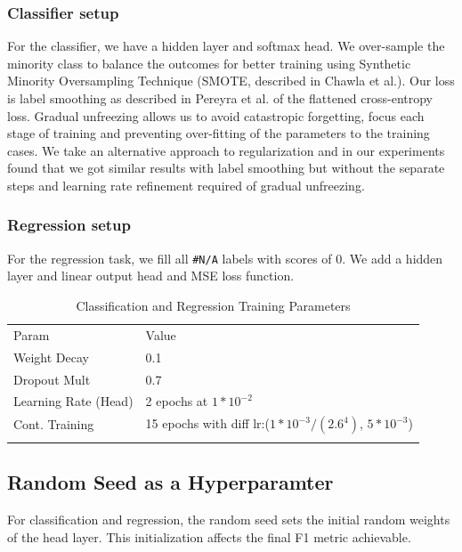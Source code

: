 \documentclass[runningheads]{llncs}
\begin{document}
\subsubsection{Classifier setup}  For the classifier, we have a hidden layer and softmax head.  We over-sample the minority class to balance the outcomes for better training using Synthetic Minority Oversampling Technique (SMOTE, described in Chawla et al.\cite{Chawla:2002:SSM:1622407.1622416}).  Our loss is label smoothing as described in Pereyra et al.\cite{Labelsmoothing:DBLP:journals/corr/PereyraTCKH17} of the flattened cross-entropy loss.  Gradual unfreezing allows us to avoid catastropic forgetting, focus each stage of training and preventing over-fitting of the parameters to the training cases.  We take an alternative approach to regularization and in our experiments found that we got similar results with label smoothing but without the separate steps and learning rate refinement required of gradual unfreezing.   
\subsubsection{Regression setup}  For the regression task, we fill all \verb|#N/A| labels with scores of 0.  We add a hidden layer and linear output head and MSE loss function. 

\begin{table}[ht]
	\caption{Classification and Regression Training Parameters}
	\label{tab:clas_training}       %
	\begin{tabular}{ll}
		\hline\noalign{\smallskip}
		Param & Value \\
		\noalign{\smallskip}\hline\noalign{\smallskip}
		Weight Decay & 0.1  \\
		Dropout Mult &  0.7 \\
		Learning Rate (Head)& 2 epochs at $1*10^{-2}$\\
		Cont. Training & 15 epochs with diff lr:($1*10^{-3}/(2.6^4)$, $5*10^{-3}$)\\
		\noalign{\smallskip}\hline
	\end{tabular}
\end{table}

\subsection{Random Seed as a Hyperparamter}
\label{sec:rand_seeds}
For classification and regression, the random seed sets the initial random weights of the head layer. This initialization affects the final F1 metric achievable.  
\end{document}
